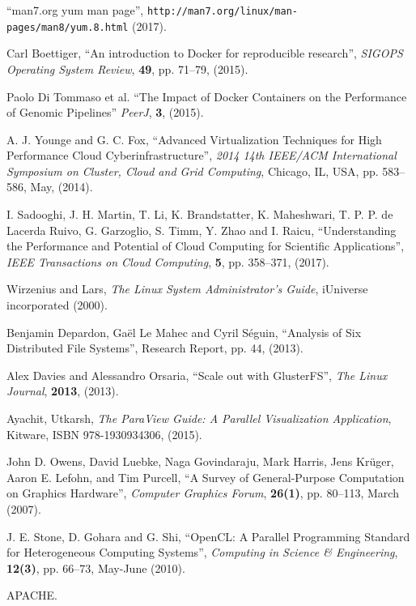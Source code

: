 \documentclass[twoside,a4paper,12pt,english]{inac19}
\begin{document}
\begin{thebibliography}{99}
 ``man7.org yum man page'', \verb#http://man7.org/linux/man-pages/man8/yum.8.html# (2017).
  
 Carl Boettiger, ``An introduction to Docker for reproducible research'', \textit{SIGOPS Operating System Review}, \textbf{49}, pp. 71--79, (2015).

 Paolo Di Tommaso et al. ``The Impact of Docker Containers on the Performance of Genomic Pipelines'' \textit{PeerJ}, \textbf{3}, (2015).

 A. J. Younge and G. C. Fox, ``Advanced Virtualization Techniques for High Performance Cloud Cyberinfrastructure'', \textit{2014 14th IEEE/ACM International Symposium on Cluster, Cloud and Grid Computing}, Chicago, IL, USA, pp. 583--586, May, (2014).
  
 I. Sadooghi, J. H. Martin, T. Li, K. Brandstatter, K. Maheshwari, T. P. P. de Lacerda Ruivo, G. Garzoglio, S. Timm, Y. Zhao and I. Raicu, ``Understanding the Performance and Potential of Cloud Computing for Scientific Applications'', \textit{IEEE Transactions on Cloud Computing}, \textbf{5}, pp. 358--371, (2017).
  
 Wirzenius and Lars, \textit{The  Linux System Administrator's Guide}, iUniverse incorporated (2000).

 Benjamin Depardon, Ga\"{e}l Le Mahec and Cyril S\'{e}guin, ``Analysis of Six Distributed File Systems'', Research Report, pp. 44, (2013).
  
 Alex Davies and Alessandro Orsaria, ``Scale out with GlusterFS'', \textit{The Linux Journal}, \textbf{2013}, (2013).


 Ayachit, Utkarsh, \textit{The ParaView Guide: A Parallel Visualization Application}, Kitware, ISBN 978-1930934306, (2015).

  John D. Owens, David Luebke, Naga Govindaraju, Mark Harris, Jens Kr\"{u}ger, Aaron E. Lefohn, and Tim Purcell, ``A Survey of General-Purpose Computation on Graphics Hardware'', \textit{Computer Graphics Forum}, \textbf{26(1)}, pp. 80--113, March (2007).

 J. E. Stone, D. Gohara and G. Shi, ``OpenCL: A Parallel Programming Standard for Heterogeneous Computing Systems'', \textit{Computing in Science \& Engineering}, \textbf{12(3)}, pp. 66--73, May-June (2010).

   APACHE.
    
\end{thebibliography}

%
%
\end{document}
